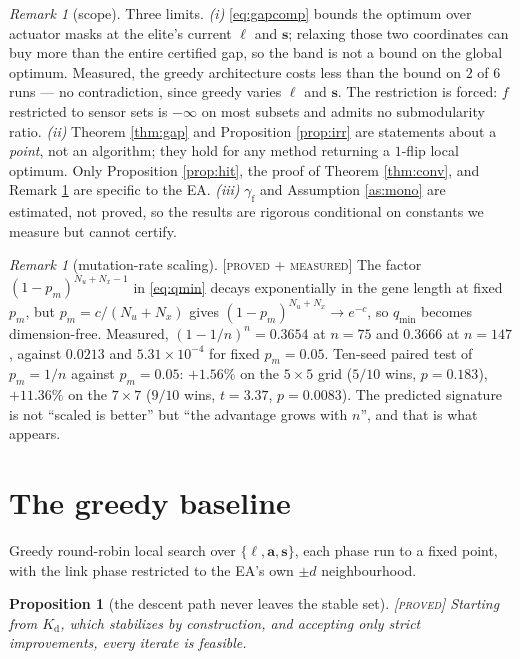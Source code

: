 \documentclass[11pt]{article}
\newtheorem{proposition}[theorem]{Proposition}
\theoremstyle{definition}
\theoremstyle{remark}
\newtheorem{remark}[theorem]{Remark}
\newcommand{\Kd}{K_{\mathrm{d}}}
\newcommand{\gf}{\gamma_{\mathrm{f}}}
\newcommand{\tagged}[1]{\textsc{[#1]}}
\begin{document}
\begin{remark}[scope]\label{rem:scope}
Three limits. \emph{(i)} \eqref{eq:gapcomp} bounds the optimum over actuator masks
at the elite's current $\ell$ and $\mathbf{s}$; relaxing those two coordinates can
buy more than the entire certified gap, so the band is not a bound on the global
optimum. Measured, the greedy architecture costs less than the bound on $2$ of $6$
runs --- no contradiction, since greedy varies $\ell$ and $\mathbf{s}$. The
restriction is forced: $f$ restricted to sensor sets is $-\infty$ on most subsets
and admits no submodularity ratio. \emph{(ii)} Theorem \ref{thm:gap} and
Proposition \ref{prop:irr} are statements about a \emph{point}, not an algorithm;
they hold for any method returning a $1$-flip local optimum. Only Proposition
\ref{prop:hit}, the proof of Theorem \ref{thm:conv}, and Remark \ref{rem:pm} are
specific to the EA. \emph{(iii)} $\gf$ and Assumption \ref{as:mono} are estimated,
not proved, so the results are rigorous conditional on constants we measure but
cannot certify.
\end{remark}

\begin{remark}[mutation-rate scaling]\label{rem:pm} \tagged{proved + measured}
The factor $(1-p_m)^{N_u+N_x-1}$ in \eqref{eq:qmin} decays exponentially in the
gene length at fixed $p_m$, but $p_m = c/(N_u+N_x)$ gives
$(1-p_m)^{N_u+N_x} \to e^{-c}$, so $q_{\min}$ becomes dimension-free. Measured,
$(1-1/n)^n = 0.3654$ at $n = 75$ and $0.3666$ at $n = 147$, against $0.0213$ and
$5.31\times10^{-4}$ for fixed $p_m = 0.05$. Ten-seed paired test of $p_m = 1/n$
against $p_m = 0.05$: $+1.56\%$ on the $5\times5$ grid ($5/10$ wins, $p = 0.183$),
$+11.36\%$ on the $7\times7$ ($9/10$ wins, $t = 3.37$, $p = 0.0083$). The predicted
signature is not ``scaled is better'' but ``the advantage grows with $n$'', and
that is what appears.
\end{remark}

\section{The greedy baseline}

Greedy round-robin local search over $\{\ell, \mathbf{a}, \mathbf{s}\}$, each phase
run to a fixed point, with the link phase restricted to the EA's own $\pm d$
neighbourhood.

\begin{proposition}[the descent path never leaves the stable set]\label{prop:G1} \tagged{proved}
Starting from $\Kd$, which stabilizes by construction, and accepting only strict
improvements, every iterate is feasible.
\end{proposition}
\end{document}

